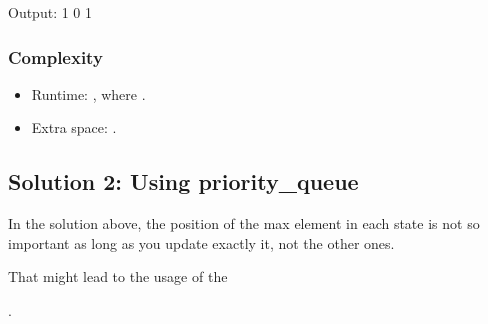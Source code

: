 \documentclass[letterpaper,12pt,english]{book}
\begin{document}
\begin{sphinxVerbatim}[commandchars=\\\{\}]
Output:
1
0
1
\end{sphinxVerbatim}


\subsubsection{Complexity}
\label{\detokenize{Priority_Queue/1354_Construct_Target_Array_With_Multiple_Sums:complexity}}\begin{itemize}
\item {} 
\sphinxAtStartPar
Runtime: , where .

\item {} 
\sphinxAtStartPar
Extra space: .

\end{itemize}


\subsection{Solution 2: Using priority\_queue}
\label{\detokenize{Priority_Queue/1354_Construct_Target_Array_With_Multiple_Sums:solution-2-using-priority-queue}}
\sphinxAtStartPar
In the solution above, the position of the max element in each state is not so important as long as you update exactly it, not the other ones.

\sphinxAtStartPar
That might lead to the usage of the %
\begin{footnote}[59]\sphinxAtStartFootnote
{}
%
\end{footnote}.
\end{document}
